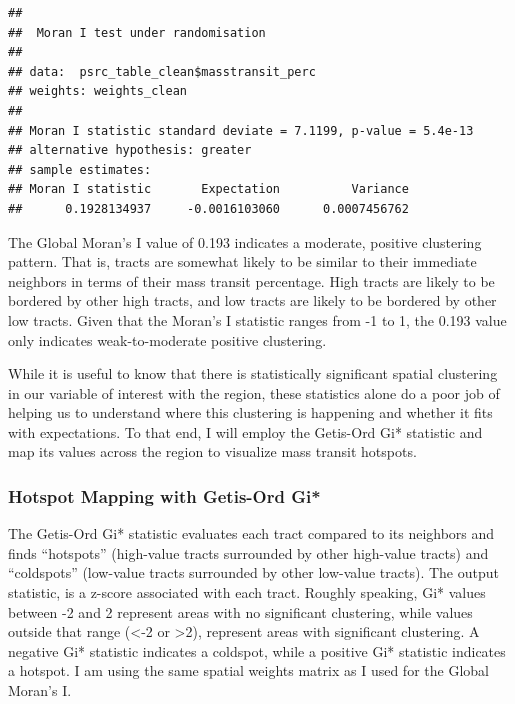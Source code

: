 \documentclass[
]{article}
\begin{document}
\begin{verbatim}
## 
##  Moran I test under randomisation
## 
## data:  psrc_table_clean$masstransit_perc  
## weights: weights_clean    
## 
## Moran I statistic standard deviate = 7.1199, p-value = 5.4e-13
## alternative hypothesis: greater
## sample estimates:
## Moran I statistic       Expectation          Variance 
##      0.1928134937     -0.0016103060      0.0007456762
\end{verbatim}

The Global Moran's I value of 0.193 indicates a moderate, positive
clustering pattern. That is, tracts are somewhat likely to be similar to
their immediate neighbors in terms of their mass transit percentage.
High tracts are likely to be bordered by other high tracts, and low
tracts are likely to be bordered by other low tracts. Given that the
Moran's I statistic ranges from -1 to 1, the 0.193 value only indicates
weak-to-moderate positive clustering.

While it is useful to know that there is statistically significant
spatial clustering in our variable of interest with the region, these
statistics alone do a poor job of helping us to understand where this
clustering is happening and whether it fits with expectations. To that
end, I will employ the Getis-Ord Gi* statistic and map its values across
the region to visualize mass transit hotspots.

\newpage

\subsubsection{Hotspot Mapping with Getis-Ord
Gi*}\label{hotspot-mapping-with-getis-ord-gi}

The Getis-Ord Gi* statistic evaluates each tract compared to its
neighbors and finds ``hotspots'' (high-value tracts surrounded by other
high-value tracts) and ``coldspots'' (low-value tracts surrounded by
other low-value tracts). The output statistic, is a z-score associated
with each tract. Roughly speaking, Gi* values between -2 and 2 represent
areas with no significant clustering, while values outside that range
(\textless-2 or \textgreater2), represent areas with significant
clustering. A negative Gi* statistic indicates a coldspot, while a
positive Gi* statistic indicates a hotspot. I am using the same spatial
weights matrix as I used for the Global Moran's I.
\end{document}
